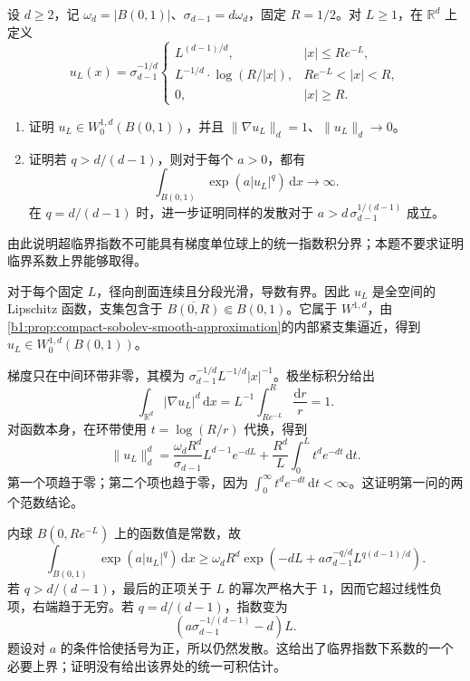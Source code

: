 \begin{optionalexercise}\label{b1:ex:24-moser-concentration}
设 \(d\ge2\)，记 \(\omega_d=|B(0,1)|\)、\(\sigma_{d-1}=d\omega_d\)，固定 \(R=1/2\)。对 \(L\ge1\)，在 \(\mathbb R^d\) 上定义
\[
 u_L(x)=\sigma_{d-1}^{-1/d}
 \begin{cases}
  L^{(d-1)/d},& |x|\le R e^{-L},\\
  L^{-1/d}\cdot \log(R/|x|),& R e^{-L}<|x|<R,\\
  0,&|x|\ge R.
 \end{cases}
\]
\begin{enumerate}
 \item\label{b1:item:24-moser-norms}
 证明 \(u_L\in W_0^{1,d}(B(0,1))\)，并且
 \(\|\nabla u_L\|_d=1\)、\(\|u_L\|_d\to0\)。
 \item\label{b1:item:24-moser-supercritical-exponent}
 证明若 \(q>d/(d-1)\)，则对于每个 \(a>0\)，都有
 \[
  \int_{B(0,1)}\exp(a|u_L|^q)\,\mathrm dx
                       \longrightarrow\infty.
 \]
 在 \(q=d/(d-1)\) 时，进一步证明同样的发散对于
 \(a>d\,\sigma_{d-1}^{1/(d-1)}\) 成立。
\end{enumerate}
由此说明超临界指数不可能具有梯度单位球上的统一指数积分界；本题不要求证明临界系数上界能够取得。
\end{optionalexercise}
\begin{solution}
对于每个固定 \(L\)，径向剖面连续且分段光滑，导数有界。因此 \(u_L\) 是全空间的
Lipschitz 函数，支集包含于 \(\overline{B(0,R)}\Subset B(0,1)\)。它属于
\(W^{1,d}\)，由\cref{b1:prop:compact-sobolev-smooth-approximation}的内部紧支集逼近，得到 \(u_L\in W_0^{1,d}(B(0,1))\)。

梯度只在中间环带非零，其模为
\(\sigma_{d-1}^{-1/d}L^{-1/d}|x|^{-1}\)。极坐标积分给出
\[
 \int_{\mathbb R^d}|\nabla u_L|^d\,\mathrm dx
       =L^{-1}\int_{Re^{-L}}^R\frac{\mathrm dr}{r}=1.
\]
对函数本身，在环带使用 \(t=\log(R/r)\) 代换，得到
\[
 \|u_L\|_d^d
 =\frac{\omega_dR^d}{\sigma_{d-1}}L^{d-1}e^{-dL}
       +\frac{R^d}{L}\int_0^L t^d e^{-dt}\,\mathrm dt.
\]
第一个项趋于零；第二个项也趋于零，因为
\(\int_0^\infty t^d e^{-dt}\,\mathrm dt<\infty\)。这证明第一问的两个范数结论。

内球 \(B(0,Re^{-L})\) 上的函数值是常数，故
\[
 \int_{B(0,1)}\exp(a|u_L|^q)\,\mathrm dx
 \ge\omega_dR^d
       \exp\left(-dL+
          a\sigma_{d-1}^{-q/d}L^{q(d-1)/d}\right).
\]
若 \(q>d/(d-1)\)，最后的正项关于 \(L\) 的幂次严格大于 \(1\)，因而它超过线性负项，右端趋于无穷。若 \(q=d/(d-1)\)，指数变为
\[
 \left(a\sigma_{d-1}^{-1/(d-1)}-d\right)L.
\]
题设对 \(a\) 的条件恰使括号为正，所以仍然发散。这给出了临界指数下系数的一个必要上界；证明没有给出该界处的统一可积估计。
\end{solution}

